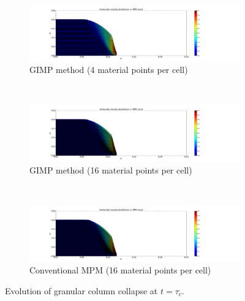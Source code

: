 \begin{figure}
	\centering
	\begin{subfigure}[b]{\textwidth}
		\centering
		\includegraphics[width=\textwidth]{4GIMPM_tc}
		\caption{GIMP method (4 material points per cell)}
		\label{fig:4GIMPM_tc}
	\end{subfigure} \\
	\begin{subfigure}[b]{\textwidth}
		\centering
		\includegraphics[width=\textwidth]{16GIMPM_tc}
		\caption{GIMP method (16 material points per cell)}
		\label{fig:16GIMPM_tc}
	\end{subfigure} \\
	\begin{subfigure}[b]{\textwidth}
		\centering
		\includegraphics[width=\textwidth]{16MPM_tc}
		\caption{Conventional MPM (16 material points per cell)}
		\label{fig:16MPM_tc}
	\end{subfigure}
	\caption*{Evolution of granular column collapse at $t = \tau_c$.}
\end{figure}

